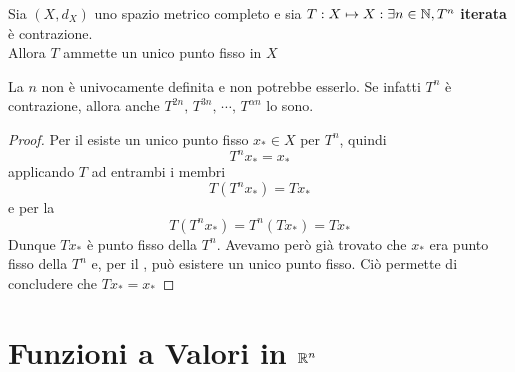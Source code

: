 \begin{theorem}
	\label{teo:iterata_contraz}
	Sia $(X,d_X)$ uno spazio metrico completo e sia $T:X\mapsto X : \exists n \in \mathbb{N}, T^n$ \textbf{iterata} è contrazione.\\
	Allora $T$ ammette un unico punto fisso in $X$
	\begin{note}
		La $n$ non è univocamente definita e non potrebbe esserlo. Se infatti $T^n$ è contrazione, allora anche $T^{2n},\, T^{3n},\, \cdots,\, T^{\alpha n}$ lo sono.
	\end{note}
	\begin{proof}
		Per il  esiste un unico punto fisso $x_* \in X$ per $T^n$, quindi
		$$T^nx_* = x_*$$
		applicando $T$ ad entrambi i membri
		$$T(T^{n}x_*) = Tx_*$$
		e per la 
		$$T(T^{n}x_*) = T^n(Tx_*) = Tx_*$$
		Dunque $Tx_*$ è punto fisso della $T^n$. Avevamo però già trovato che $x_*$ era punto fisso della $T^n$ e, per il , può esistere un unico punto fisso. Ciò permette di concludere che $Tx_* = x_*$
	\end{proof}
\end{theorem}

\section{Funzioni a Valori in \texorpdfstring{$\protect \mathbb{R}^n$}{Rn}}
